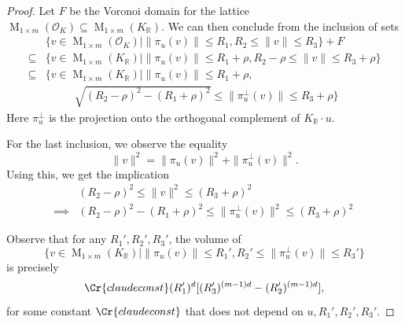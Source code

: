 \documentclass{amsart}
\theoremstyle{definition}
\theoremstyle{remark}
\newcommand{\OK}{\mathcal{O}_K}
\newcommand{\KR}{K_\mathbb{R}}
\DeclareMathOperator{\M}{M}
\begin{document}
\begin{proof}
    Let $F$ be the Voronoi domain for the lattice $\M_{1 \times m}(\OK) \subseteq \M_{1 \times m}(\KR)$.
    We can then conclude from the inclusion of sets
    \begin{align}
     &  
     \{ v \in \M_{1 \times m}(\OK) \mid  \|\pi_{u}(v)\| \leq R_{1}, R_{2}\leq \|v\| \leq R_{3}\}  
     + F \\
        \subseteq &
        \{ v \in \M_{1 \times m}(\KR) \mid \|\pi_{u}(v)\| \leq R_{1} + \rho,R_{2} - \rho\leq \|v\| \leq R_{3}+ \rho \} \\
        \subseteq &
        \Big\{ v \in \M_{1 \times m}(\KR) \mid \|\pi_{u}(v)\| \leq R_{1} + \rho, \\ 
                  & \ \ \ \  \ \ \ \ \ \ \ \   \sqrt{(R_{2}- \rho)^{2}   - (R_{1} + \rho)^{2} } \leq \|\pi_{u}^{\perp}(v)\| \leq R_{3}+ \rho \Big\}
    \end{align}
    Here $\pi_{u}^{\perp}$ is the projection onto the orthogonal complement of $\KR \cdot u$.


    For the last inclusion, we observe the equality
    \begin{equation}
        \|v\|^{2} =  \| \pi_{u}(v)\|^{2} + \|\pi_{u}^{\perp}(v)\|^{2} .
    \end{equation}
    Using this, we get the implication 
    \begin{align}
     &  
     (R_{2}- \rho)^{2} \leq  \|v\|^{2}  \leq (R_{3} + \rho)^{2}  \\
        \implies    &   (R_{2}- \rho)^{2}   - (R_{1} + \rho)^{2} \leq 
        \|\pi_{u}^{\perp}(v)\|^{2} \leq (R_{3} + \rho)^{2}  \
    \end{align}

    Observe that for any $R_{1}',R_{2}',R_{3}'$, the volume of 
    \begin{equation}
        \{ v \in \M_{1 \times m}(\KR) \mid \|\pi_{u}(v)\| \leq R_{1}',  R_{2}' \leq \|\pi_{u}^{\perp}(v)\| \leq R_{3}' \}
    \end{equation}
    is precisely
    \begin{equation}
        \Cr{claudeconst} (R_{1}')^{d} [(R_{3}')^{(m-1)d} - (R_{2}')^{(m-1)d} ],
    \end{equation}
    for some constant $\Cr{claudeconst}$ that does not depend on $u,R_{1}',R_{2}',R_{3}'$.
\end{proof}
\end{document}
